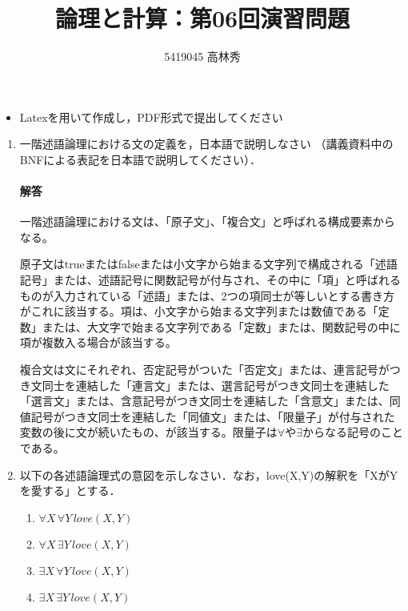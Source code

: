 \documentclass[dvipdfmx]{jsarticle}
\def\NO{06}
\def\LECTURENAME{論理と計算}
\begin{document}
\title{\LECTURENAME{}：第\NO{}回演習問題}

\author{5419045 高林秀}

\date{}
\maketitle

\begin{itemize}
\item Latexを用いて作成し，PDF形式で提出してください
\end{itemize}


\vspace*{\baselineskip}

\begin{enumerate}\setlength{\itemsep}{\baselineskip}
\item  一階述語論理における文の定義を，日本語で説明しなさい
（講義資料中のBNFによる表記を日本語で説明してください）．
\paragraph{解答}一階述語論理における文は、「原子文」、「複合文」と呼ばれる構成要素からなる。\par
原子文はtrueまたはfalseまたは小文字から始まる文字列で構成される「述語記号」または、述語記号に関数記号が付与され、その中に「項」と呼ばれるものが入力されている「述語」または、2つの項同士が等しいとする書き方がこれに該当する。項は、小文字から始まる文字列または数値である「定数」または、大文字で始まる文字列である「定数」または、関数記号の中に項が複数入る場合が該当する。\par
複合文は文にそれぞれ、否定記号がついた「否定文」または、連言記号がつき文同士を連結した「連言文」または、選言記号がつき文同士を連結した「選言文」または、含意記号がつき文同士を連結した「含意文」または、同値記号がつき文同士を連結した「同値文」または、「限量子」が付与された変数の後に文が続いたもの、が該当する。限量子は$\forall$や$\exists$からなる記号のことである。

\item 以下の各述語論理式の意図を示しなさい．なお，love(X,Y)の解釈を「XがYを愛する」とする．
  \begin{enumerate}
  \item $\forall X\,\forall Y\, love(X,Y)$
  \item $\forall X\,\exists Y\, love(X,Y)$
  \item $\exists X\,\forall Y\, love(X,Y)$
  \item $\exists X\,\exists Y\, love(X,Y)$
  \end{enumerate}

\end{enumerate}
\end{document}
